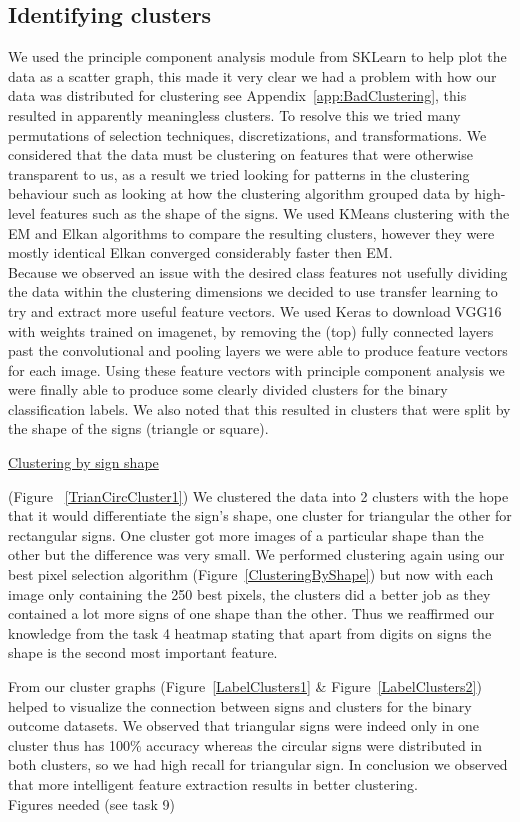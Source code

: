 \documentclass[11pt]{article}
\begin{document}
\subsection{Identifying clusters}
We used the principle component analysis module from SKLearn to help plot the data as a scatter graph, this made it very clear we had a problem with how our data was distributed for clustering see Appendix~\ref{app:BadClustering}, this resulted in apparently meaningless clusters.
To resolve this we tried many permutations of selection techniques, discretizations, and transformations. 
We considered that the data must be clustering on features that were otherwise transparent to us, as a result we tried looking for patterns in the clustering behaviour such as looking at how the clustering algorithm grouped data by high-level features such as the shape of the signs.
We used KMeans clustering with the EM and Elkan algorithms to compare the resulting clusters, however they were mostly identical Elkan converged considerably faster then EM.\\
Because we observed an issue with the desired class features not usefully dividing the data within the clustering dimensions we decided to use transfer learning to try and extract more useful feature vectors.
We used Keras to download VGG16 with weights trained on imagenet, by removing the (top) fully connected layers past the convolutional and pooling layers we were able to produce feature vectors for each image. Using these feature vectors with principle component analysis we were finally able to produce some clearly divided clusters for the binary classification labels. 
We also noted that this resulted in clusters that were split by the shape of the signs (triangle or square).   

\underline{Clustering by sign shape}
\par
(Figure ~\ref{TrianCircCluster1}) We clustered the data into 2 clusters with the hope that it would differentiate the sign's shape, one cluster for triangular the other for rectangular signs. 
One cluster got more images of a particular shape than the other but the difference was very small.
We performed clustering again using our best pixel selection algorithm (Figure~\ref{ClusteringByShape}) but now with each image only containing the 250 best pixels, the clusters did a better job as they contained a lot more signs of one shape than the other. Thus we reaffirmed our knowledge from the task 4 heatmap stating that apart from digits on signs the shape is the second most important feature. 
\par
From our cluster graphs (Figure~\ref{LabelClusters1} \& Figure~\ref{LabelClusters2}) helped to visualize the connection between signs and clusters for the binary outcome datasets. We observed that triangular signs were indeed only in one cluster thus has 100\% accuracy whereas the circular signs were distributed in both clusters, so we had high recall for triangular sign. 
In conclusion we observed that more intelligent feature extraction results in better clustering. \\
{\huge Figures needed (see task 9)}
\end{document}
